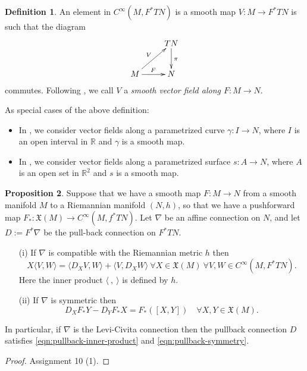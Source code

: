 \documentclass{amsart}
\numberwithin{equation}{section}
\newcommand{\bR}{\mathbb{R}}
\newcommand{\fX}{\mathfrak{X}}
\theoremstyle{definition}
\newtheorem{definition}{Definition} [section]
\theoremstyle{theorem}
\newtheorem{proposition}[definition]{Proposition}
\begin{document}
\begin{definition}
An element in $C^\infty(M,F^*TN)$ is a smooth map $V : M \to F^*TN$ is such that the diagram 
\[
\xymatrix{ 
& TN \ar[d]^{\pi} \\
M \ar[ru]^{V} \ar[r]^{F}& N
}
\]
commutes. Following \cite{dC}, we call $V$ a {\em smooth vector field along $F :M \to N$}. 
\end{definition}

As special cases of the above definition:
\begin{itemize}
\item In \cite[Chapter 2]{dC}, we consider vector fields
along a parametrized curve $\gamma:I\to N$, where $I$ is an open interval in $\bR$
and $\gamma$ is a smooth map.
\item In \cite[Chapter 3]{dC}, we consider vector fields along
a parametrized surface $s:A\to N$, where $A$ is an open set in $\bR^2$ and $s$ is a smooth map.
\end{itemize}


\begin{proposition}\label{pullback-properties}
Suppose that we have a smooth map $F : M \to N$ from a smooth manifold  $M$ to a Riemannian manifold $(N,h)$,
so that we have a pushforward map $F_*:\fX(M)\to C^\infty(M,f^*TN)$.
Let $\nabla$ be an affine connection on $N$, and let $D:= F^*\nabla$ be the pull-back connection
on $F^*TN$. 
\begin{enumerate}
\item[(i)] If $\nabla$ is compatible with the Riemannian metric $h$ then 
\begin{equation}\label{eqn:pullback-inner-product}
X\langle V, W \rangle = \langle D_XV, W\rangle + \langle V, D_X W \rangle \  \forall X \in \mathfrak{X}(M)
\  \forall V,W \in C^\infty(M, F^*TN).
\end{equation}
Here the inner product $\langle \ , \ \rangle$ is defined by $h$.

\item[(ii)] If $\nabla$ is symmetric then 
\begin{equation}\label{eqn:pullback-symmetry}
D_X F_*Y - D_Y F_*X = F_*([X,Y]) \quad \forall X,Y\in \mathfrak{X}(M). 
\end{equation}
\end{enumerate}
In particular, if $\nabla$ is the Levi-Civita connection then the pullback connection $D$
satisfies \eqref{eqn:pullback-inner-product} and \eqref{eqn:pullback-symmetry}.  
\end{proposition}
\begin{proof} Assignment 10 (1).
\end{proof}
\end{document}
